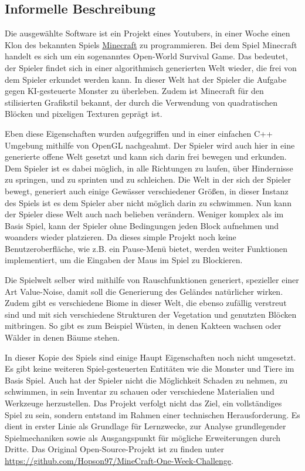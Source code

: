 \documentclass{article}
\begin{document}
\subsection{Informelle Beschreibung} \label{subsec:inf}

Die ausgewählte Software ist ein Projekt eines Youtubers, in einer Woche einen Klon des bekannten Spiels \href{https://www.minecraft.net}{Minecraft} zu programmieren. Bei dem Spiel Minecraft handelt es sich um ein sogenanntes Open-World Survival Game. Das bedeutet, der Spieler findet sich in einer algorithmisch generierten Welt wieder, die frei von dem Spieler erkundet werden kann. In dieser Welt hat der Spieler die Aufgabe gegen KI-gesteuerte Monster zu überleben. Zudem ist Minecraft für den stilisierten Grafikstil bekannt, der durch die Verwendung von quadratischen Blöcken und pixeligen Texturen geprägt ist.

Eben diese Eigenschaften wurden aufgegriffen und in einer einfachen C++ Umgebung mithilfe von OpenGL nachgeahmt. Der Spieler wird auch hier in eine generierte offene Welt gesetzt und kann sich darin frei bewegen und erkunden. Dem Spieler ist es dabei möglich, in alle Richtungen zu laufen, über Hindernisse zu springen, und zu sprinten und zu schleichen. Die Welt in der sich der Spieler bewegt, generiert auch einige Gewässer verschiedener Größen, in dieser Instanz des Spiels ist es dem Spieler aber nicht möglich darin zu schwimmen. Nun kann der Spieler diese Welt auch nach belieben verändern. Weniger komplex als im Basis Spiel, kann der Spieler ohne Bedingungen jeden Block aufnehmen und woanders wieder platzieren. Da dieses simple Projekt noch keine Benutzeroberfläche, wie z.B. ein Pause-Menü bietet, werden weiter Funktionen implementiert, um die Eingaben der Maus im Spiel zu Blockieren.

Die Spielwelt selber wird mithilfe von Rauschfunktionen generiert, spezieller einer Art Value-Noise, damit soll die Generierung des Geländes natürlicher wirken. Zudem gibt es verschiedene Biome in dieser Welt, die ebenso zufällig verstreut sind und mit sich verschiedene Strukturen der Vegetation und genutzten Blöcken mitbringen. So gibt es zum Beispiel Wüsten, in denen Kakteen wachsen oder Wälder in denen Bäume stehen.

In dieser Kopie des Spiels sind einige Haupt Eigenschaften noch nicht umgesetzt. Es gibt keine weiteren Spiel-gesteuerten Entitäten wie die Monster und Tiere im Basis Spiel. Auch hat der Spieler nicht die Möglichkeit Schaden zu nehmen, zu schwimmen, in sein Inventar zu schauen oder verschiedene Materialien und Werkzeuge herzustellen. Das Projekt verfolgt nicht das Ziel, ein vollständiges Spiel zu sein, sondern entstand im Rahmen einer technischen Herausforderung. Es dient in erster Linie als Grundlage für Lernzwecke, zur Analyse grundlegender Spielmechaniken sowie als Ausgangspunkt für mögliche Erweiterungen durch Dritte. Das Original Open-Source-Projekt ist zu finden unter \url{https://github.com/Hopson97/MineCraft-One-Week-Challenge}.
\end{document}
